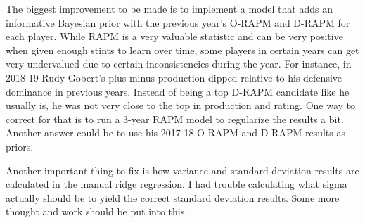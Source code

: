 \documentclass[]{article}
\begin{document}
The biggest improvement to be made is to implement a model that adds an
informative Bayesian prior with the previous year's O-RAPM and D-RAPM
for each player. While RAPM is a very valuable statistic and can be very
positive when given enough stints to learn over time, some players in
certain years can get very undervalued due to certain inconsistencies
during the year. For instance, in 2018-19 Rudy Gobert's plus-minus
production dipped relative to his defensive dominance in previous years.
Instead of being a top D-RAPM candidate like he usually is, he was not
very close to the top in production and rating. One way to correct for
that is to run a 3-year RAPM model to regularize the results a bit.
Another answer could be to use his 2017-18 O-RAPM and D-RAPM results as
priors.

Another important thing to fix is how variance and standard deviation
results are calculated in the manual ridge regression. I had trouble
calculating what sigma actually should be to yield the correct standard
deviation results. Some more thought and work should be put into this.
\end{document}

